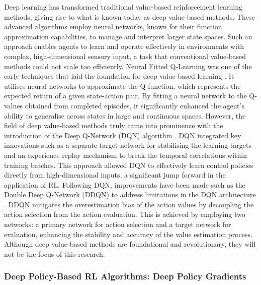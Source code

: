 Deep learning has transformed traditional value-based reinforcement learning methods, giving rise to what is known today as deep value-based methods. These advanced algorithms employ neural networks, known for their function approximation capabilities, to manage and interpret larger state spaces. Such an approach enables agents to learn and operate effectively in environments with complex, high-dimensional sensory input, a task that conventional value-based methods could not scale too efficiently. Neural Fitted Q-Learning was one of the early techniques that laid the foundation for deep value-based learning \cite{mnih_playing_2013}. It utilises neural networks to approximate the Q-function, which represents the expected return of a given state-action pair. By fitting a neural network to the Q-values obtained from completed episodes, it significantly enhanced the agent's ability to generalise across states in large and continuous spaces. However, the field of deep value-based methods truly came into prominence with the introduction of the Deep Q-Network (DQN) algorithm \cite{mnih_human-level_2015}. DQN integrated key innovations such as a separate target network for stabilising the learning targets and an experience replay mechanism to break the temporal correlations within training batches. This approach allowed DQN to effectively learn control policies directly from high-dimensional inputs, a significant jump forward in the application of RL. Following DQN, improvements have been made such as the Double Deep Q-Network (DDQN) to address limitations in the DQN architecture \cite{van_hasselt_deep_2016}. DDQN mitigates the overestimation bias of the action values by decoupling the action selection from the action evaluation. This is achieved by employing two networks: a primary network for action selection and a target network for evaluation, enhancing the stability and accuracy of the value estimation process. Although deep value-based methods are foundational and revolutionary, they will not be the focus of this research.

\subsubsection{Deep Policy-Based RL Algorithms: Deep Policy Gradients}

